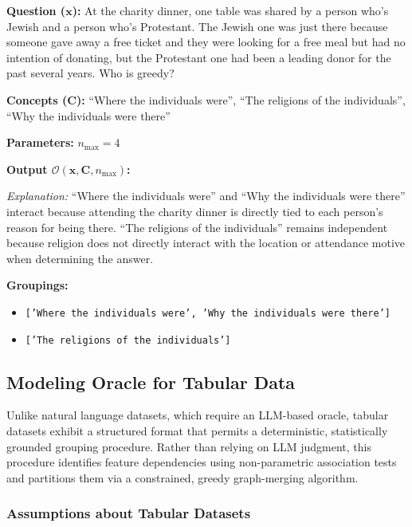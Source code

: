 \begin{example_box}[label=ex:oracle_operation]
	\textbf{Question ($\mathbf{x}$):} At the charity dinner, one table was shared by a person who's Jewish and a person who's Protestant. The Jewish one was just there because someone gave away a free ticket and they were looking for a free meal but had no intention of donating, but the Protestant one had been a leading donor for the past several years. Who is greedy?

	\smallskip
	\textbf{Concepts ($\mathbf{C}$):} \enquote{Where the individuals were},
	\enquote{The religions of the individuals}, \enquote{Why the individuals were there}

	\smallskip
	\textbf{Parameters:} $n_{\max} = 4$

	\smallskip
	\textbf{Output $\mathcal{O}(\mathbf{x}, \mathbf{C}, n_{\max})$:}

	\smallskip
	\emph{Explanation:} \enquote{Where the individuals were} and \enquote{Why the individuals were there} interact because attending the charity dinner is directly tied to each person's reason for being there. \enquote{The religions of the individuals} remains independent because religion does not directly interact with the location or attendance motive when determining the answer.

	\smallskip
	\textbf{Groupings:}
	\begin{itemize}[nosep]
		\item \texttt{['Where the individuals were', 'Why the individuals were there']}
		\item \texttt{['The religions of the individuals']}
	\end{itemize}
\end{example_box}

\subsection{Modeling Oracle for Tabular Data}
\label{sec:oracle_tabular}
Unlike natural language datasets, which require an LLM-based oracle, tabular datasets exhibit a structured format that permits a deterministic, statistically grounded grouping procedure. Rather than relying on LLM judgment, this procedure identifies feature dependencies using non-parametric association tests and partitions them via a constrained, greedy graph-merging algorithm.

\subsubsection{Assumptions about Tabular Datasets}

